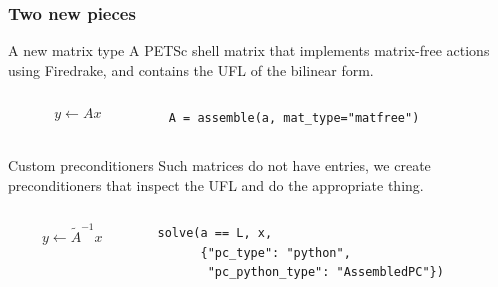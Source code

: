 \documentclass[presentation,aspectratio=43]{beamer}
\begin{document}
\begin{frame}[fragile,t]
  \frametitle{Two new pieces}
  \begin{block}{A new matrix type}
    A PETSc shell matrix that implements matrix-free actions using
    Firedrake, and contains the UFL of the bilinear form.
    \begin{columns}
      \begin{column}{0.5\textwidth}
      \begin{equation*}
        y \leftarrow A x
      \end{equation*}
    \end{column}
    \hspace{-0.1\textwidth}
    \begin{column}{0.7\textwidth}
\begin{verbatim}
A = assemble(a, mat_type="matfree")
\end{verbatim}
    \end{column}
    \end{columns}
  \end{block}
  \vspace{1.5\baselineskip}
  \begin{block}{Custom preconditioners}
    Such matrices do not have entries, we create preconditioners
    that inspect the UFL and do the appropriate thing.
    \begin{columns}
      \begin{column}{0.5\textwidth}
    \begin{equation*}
      y \leftarrow \tilde{A}^{-1} x
    \end{equation*}
  \end{column}
  \hspace{-0.1\textwidth}
  \begin{column}{0.7\textwidth}
\begin{verbatim}
solve(a == L, x,
      {"pc_type": "python",
       "pc_python_type": "AssembledPC"})
\end{verbatim}
  \end{column}
  \end{columns}
  \end{block}
\end{frame}
\end{document}
